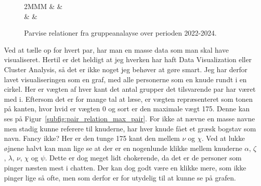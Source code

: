 \begin{article}
\begin{figure}[t!]
	\centering
	\begin{tabularx}{2\columnwidth}{MMM}
		\resizebox{.64\columnwidth}{!}{}
		&
		\resizebox{.64\columnwidth}{!}{}
		&
		\resizebox{.64\columnwidth}{!}{}
		\\
		\label{subfig:pair_relation_max_pair}
		&
		\label{subfig:pair_relation_group_count}
		&
		\label{subfig:pair_relation_max_group_count}
	\end{tabularx}
	\vspace{-25pt}
	\caption{Parvise relationer fra gruppeanalayse over perioden 2022-2024.}
	\label{fig:pair_relation}
\end{figure}

Ved at tælle op for hvert par, har man en masse data som man skal have visualiseret. Hertil er det heldigt at jeg hverken har haft Data Visualization eller Cluster Analysis, så det er ikke noget jeg behøver at gøre smart. Jeg har derfor lavet visualiseringen som en graf, med alle personerne som en knude rundt i en cirkel. Her er vægten af hver kant det antal grupper det tilsvarende par har været med i. Eftersom det er for mange tal at læse, er vægten repræsenteret som tonen på kanten, hvor hvid er vægten 0 og sort er den maximale vægt 175.
Denne kan ses på Figur~\ref{subfig:pair_relation_max_pair}. For ikke at nævne en masse navne men stadig kunne referere til knuderne, har hver knude fået et græsk bogstav som navn. Fancy ikke?
Her er den tunge 175 kant den mellem $\nu$ og $\chi$. Ved at lukke øjnene halvt kan man lige se at der er en nogenlunde klikke mellem knuderne $\alpha$, $\zeta$, $\lambda$, $\nu$, $\chi$ og $\psi$. Dette er dog meget lidt chokerende, da det er de personer som pinger næsten mest i chatten. Der kan dog godt være en klikke mere, som ikke pinger lige så ofte, men som derfor er for utydelig til at kunne se på grafen.


\end{article}
